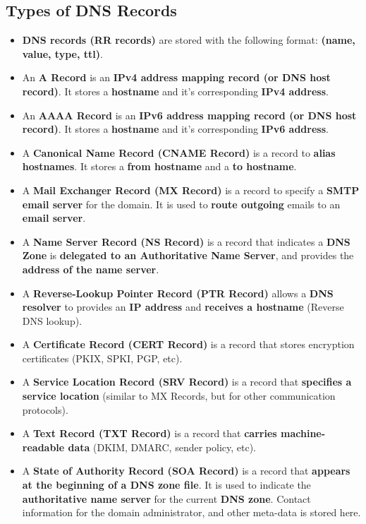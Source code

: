 \documentclass{article}
\begin{document}
    \subsection*{Types of DNS Records}
    \begin{itemize}
        \item \textbf{DNS records (RR records)} are stored with the following format: \textbf{(name, value, type, ttl)}.
        \item An \textbf{A Record} is an \textbf{IPv4 address mapping record (or DNS host record)}. It stores a \textbf{hostname} and it's corresponding \textbf{IPv4 address}.
        \item An \textbf{AAAA Record} is an \textbf{IPv6 address mapping record (or DNS host record)}. It stores a \textbf{hostname} and it's corresponding \textbf{IPv6 address}.
        \item A \textbf{Canonical Name Record (CNAME Record)} is a record to \textbf{alias hostnames}. It stores a \textbf{from hostname} and a \textbf{to hostname}.
        \item A \textbf{Mail Exchanger Record (MX Record)} is a record to specify a \textbf{SMTP email server} for the domain. It is used to \textbf{route outgoing} emails to an \textbf{email server}.
        \item A \textbf{Name Server Record (NS Record)} is a record that indicates a \textbf{DNS Zone} is \textbf{delegated to an Authoritative Name Server}, and provides the \textbf{address of the name server}.
        \item A \textbf{Reverse-Lookup Pointer Record (PTR Record)} allows a \textbf{DNS resolver} to provides an \textbf{IP address} and \textbf{receives a hostname} (Reverse DNS lookup).
        \item A \textbf{Certificate Record (CERT Record)} is a record that stores encryption certificates (PKIX, SPKI, PGP, etc).
        \item A \textbf{Service Location Record (SRV Record)} is a record that \textbf{specifies a service location} (similar to MX Records, but for other communication protocols).
        \item A \textbf{Text Record (TXT Record)} is a record that \textbf{carries machine-readable data} (DKIM, DMARC, sender policy, etc).
        \item A \textbf{State of Authority Record (SOA Record)} is a record that \textbf{appears at the beginning of a DNS zone file}. It is used to indicate the \textbf{authoritative name server} for the current \textbf{DNS zone}. Contact information for the domain administrator, and other meta-data is stored here.
    \end{itemize}
\end{document}
